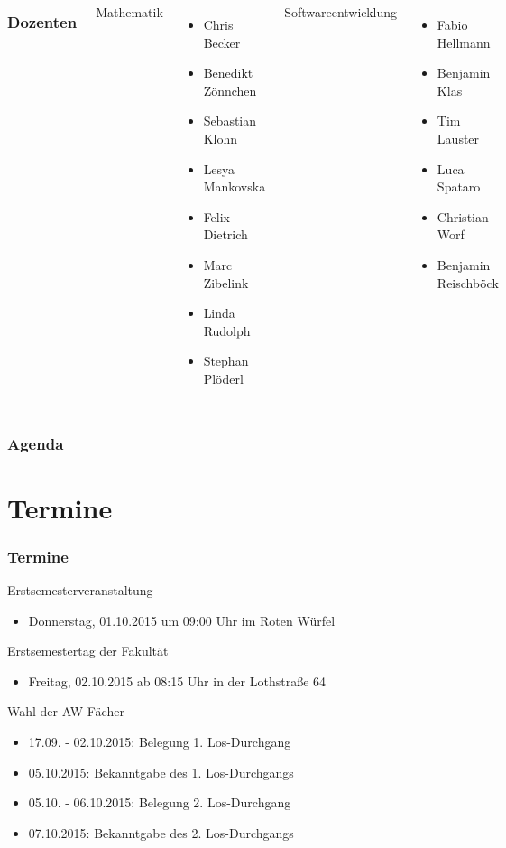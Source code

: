 \documentclass{beamer}
\begin{document}
	\begin{frame}
		\begin{columns}[t]
			\frametitle{Dozenten}
			Mathematik
			\begin{itemize}
				\item Chris Becker
				\item Benedikt Zönnchen
				\item Sebastian Klohn
				\item Lesya Mankovska
				\item Felix Dietrich
				\item Marc Zibelink
				\item Linda Rudolph
				\item Stephan Plöderl
			\end{itemize}
			Softwareentwicklung
			\begin{itemize}
				\item Fabio Hellmann
				\item Benjamin Klas
				\item Tim Lauster
				\item Luca Spataro
				\item Christian Worf
				\item Benjamin Reischböck
			\end{itemize}
		\end{columns}
	\end{frame}
	
	\begin{frame}
		\frametitle{Agenda}
		\tableofcontents
	\end{frame}
	
	\section{Termine}
	\begin{frame}
		\frametitle{Termine}
		Erstsemesterveranstaltung
		\begin{itemize}
			\item Donnerstag, 01.10.2015 um 09:00 Uhr im Roten Würfel
		\end{itemize}
		\pause
		Erstsemestertag der Fakultät
		\begin{itemize}
			\item Freitag, 02.10.2015 ab 08:15 Uhr in der Lothstraße 64
		\end{itemize}
		\pause
		Wahl der AW-Fächer
		\begin{itemize}
			\item 17.09. - 02.10.2015: Belegung 1. Los-Durchgang
			\item 05.10.2015: Bekanntgabe des 1. Los-Durchgangs
			\item 05.10. - 06.10.2015: Belegung 2. Los-Durchgang
			\item 07.10.2015: Bekanntgabe des 2. Los-Durchgangs
		\end{itemize}
	\end{frame}
	
\end{document}
